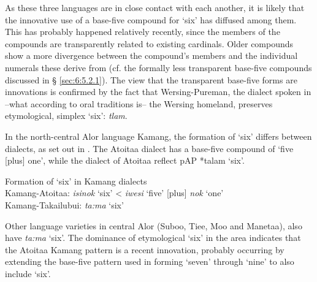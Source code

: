  

  

  

As these three languages are in close contact with each another, it is likely that the innovative  use of a base-five compound for `six' has diffused among them. This has probably happened relatively recently, since the members of the compounds are transparently related to existing cardinals. Older compounds show a more divergence between the compound's members and the individual numerals these derive from (cf. the formally less transparent base-five compounds discussed in {\S} \ref{sec:6:5.2.1}). The view that the transparent base-five forms are innovations is confirmed by the fact that Wersing-Pureman, the dialect spoken in --what according to oral traditions is-- the Wersing homeland, preserves etymological, simplex `six': \textit{t{\textschwa}lam}.

In the north-central Alor language Kamang, the formation of `six' differs between dialects, as set out in . The Atoitaa dialect has a base-five compound of `five [plus] one', while the dialect of Atoitaa reflect p\textsc{AP} *talam `six'. 



\ea%
\label{ex:6:5}
 \upshape Formation of `six' in Kamang dialects\\
 Kamang{}-Atoitaa: 
\textit{isi}\textit{{\ng}}\textit{nok}\textbf{} `six'     {\textless} \textit{iwesi}\textit{{\ng}} `five' [plus] \textit{nok} `one'\\
    Kamang{}-Takailubui:
    \textit{ta:ma} `six'      \\ 
\z





Other language varieties in central Alor (Suboo, Tiee, Moo and Manetaa), also have \textit{ta:ma} `six'. The dominance of etymological `six' in the area indicates that the Atoitaa Kamang pattern is a recent innovation, probably occurring by extending the base-five pattern used in forming `seven' through `nine' to also include `six'. 


